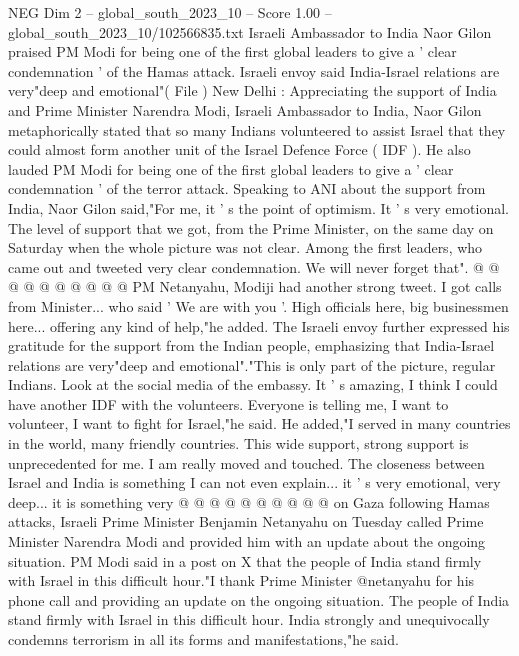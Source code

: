 \begin{textsample}{NEG Dim 2 – global\_south\_2023\_10 – Score 1.00 – global\_south\_2023\_10/102566835.txt}  \label{ex:f2_neg_276}
Israeli Ambassador to India Naor Gilon praised PM Modi for being one of the first global leaders to give a ' clear condemnation ' of the Hamas attack.
Israeli envoy said India-Israel relations are very"deep and emotional"( File ) New Delhi : Appreciating the support of India and Prime Minister Narendra Modi, Israeli Ambassador to India, Naor Gilon metaphorically stated that so many Indians volunteered to assist Israel that they could almost form another unit of the Israel Defence Force ( IDF ).
He also lauded PM Modi for being one of the first global leaders to give a ' clear condemnation ' of the terror attack.
Speaking to ANI about the support from India, Naor Gilon said,"For me, it ' s the point of optimism.
It ' s very emotional.
The level of support that we got, from the Prime Minister, on the same day on Saturday when the whole picture was not clear.
Among the first leaders, who came out and tweeted very clear condemnation.
We will never forget that". @ @ @ @ @ @ @ @ @ @ PM Netanyahu, Modiji had another strong tweet.
I got calls from Minister... who said ' We are with you '.
High officials here, big businessmen here... offering any kind of help,"he added.
The Israeli envoy further expressed his gratitude for the support from the Indian people, emphasizing that India-Israel relations are very"deep and emotional"."This is only part of the picture, regular Indians.
Look at the social media of the embassy.
It ' s amazing, I think I could have another IDF with the volunteers.
Everyone is telling me, I want to volunteer, I want to fight for Israel,"he said.
He added,"I served in many countries in the world, many friendly countries.
This wide support, strong support is unprecedented for me.
I am really moved and touched.
The closeness between Israel and India is something I can not even explain... it ' s very emotional, very deep... it is something very @ @ @ @ @ @ @ @ @ @ on Gaza following Hamas attacks, Israeli Prime Minister Benjamin Netanyahu on Tuesday called Prime Minister Narendra Modi and provided him with an update about the ongoing situation.
PM Modi said in a post on X that the people of India stand firmly with Israel in this difficult hour."I thank Prime Minister @netanyahu for his phone call and providing an update on the ongoing situation.
The people of India stand firmly with Israel in this difficult hour.
India strongly and unequivocally condemns terrorism in all its forms and manifestations,"he said.

\end{textsample}
